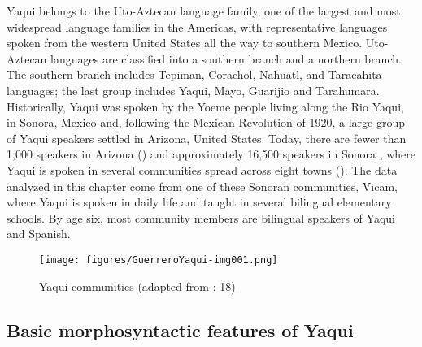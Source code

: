 \documentclass[output=paper]{langscibook}
\begin{document}
Yaqui belongs to the Uto-Aztecan language family, one of the largest and most widespread language families in the Americas, with representative languages spoken from the western United States all the way to southern Mexico. Uto-Aztecan languages are classified into a southern branch and a northern branch. The southern branch includes Tepiman, Corachol, Nahuatl, and Taracahita languages; the last group includes Yaqui, Mayo, Guarijio and Tarahumara. Historically, Yaqui was spoken by the Yoeme people living along the Rio Yaqui, in Sonora, Mexico and, following the Mexican Revolution of 1920, a large group of Yaqui speakers settled in Arizona, United States. Today, there are fewer than 1,000 speakers in Arizona (\citealt{SimonsFennig2017}) and approximately 16,500 speakers in Sonora \citep{INEGI2010}, where Yaqui is spoken in several communities spread across eight towns (). The data analyzed in this chapter come from one of these Sonoran communities, Vicam, where Yaqui is spoken in daily life and taught in several bilingual elementary schools. By age six, most community members are bilingual speakers of Yaqui and Spanish.



\begin{figure}
\texttt{[image: figures/GuerreroYaqui-img001.png]}
\caption{Yaqui communities (adapted from \citealt{Estrada2009}: 18)}
\label{fig:guerrero:1}
\end{figure}


\subsection{Basic morphosyntactic features of Yaqui}\label{sec:guerrero:1.2}
\end{document}
